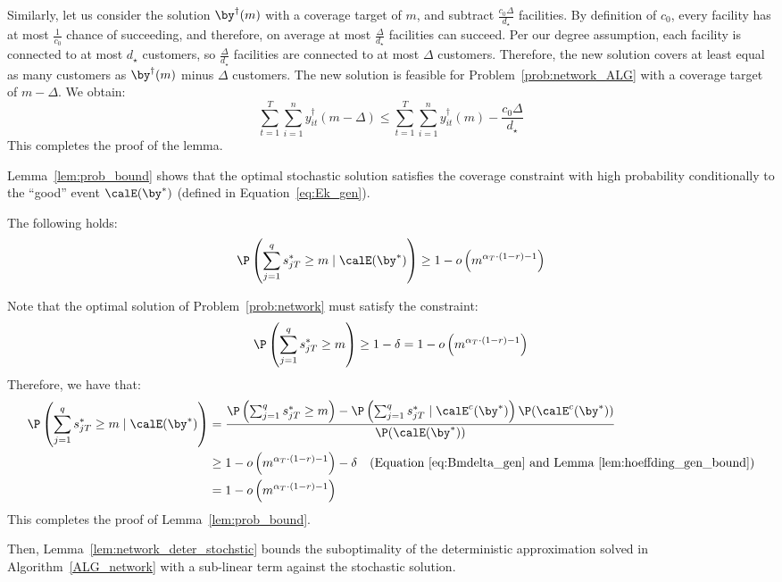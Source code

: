 \documentclass[blindrev]{informs3noheader}
\begin{document}
Similarly, let us consider the solution $\by^\dagger(m)$ with a coverage target of $m$, and subtract $\frac{c_0 \Delta}{d_\star}$ facilities. By definition of $c_0$, every facility has at most $\frac{1}{c_0}$ chance of succeeding, and therefore, on average at most $\frac{\Delta}{d_\star}$ facilities can succeed. Per our degree assumption, each facility is connected to at most $d_\star$ customers, so $\frac{\Delta}{d_\star}$ facilities are connected to at most $\Delta$ customers. Therefore, the new solution covers at least equal as many customers as $\by^\dagger(m)$ minus $\Delta$ customers. The new solution is feasible for Problem~\eqref{prob:network_ALG} with a coverage target of $m-\Delta$. We obtain:
\[\sum_{t=1}^T \sum_{i=1}^n y_{it}^\dagger(m-\Delta)\leq \sum_{t=1}^T \sum_{i=1}^n y_{it}^\dagger(m)-\frac{c_0 \Delta}{d_\star}\]
This completes the proof of the lemma.
\hfill\Halmos

Lemma~\ref{lem:prob_bound} shows that the optimal stochastic solution satisfies the coverage constraint with high probability conditionally to the ``good'' event $\calE(\by^*)$ (defined in Equation~\eqref{eq:Ek_gen}).

\begin{lemma}\label{lem:prob_bound}
The following holds:
\[\P\left(\sum_{j=1}^q s^*_{jT}\geq m\mid \calE(\by^*) \right)\geq 1-o\left(m^{\alpha_T\cdot(1-r)-1}\right)\]
\end{lemma}
Note that the optimal solution of Problem~\eqref{prob:network} must satisfy the constraint:
\begin{equation}
\P\left(\sum_{j=1}^q s^*_{jT}\geq m\right)\geq 1-\delta = 1-o\left(m^{\alpha_T\cdot(1-r)-1}\right)\label{eq:Bmdelta_gen}
\end{equation}
Therefore, we have that:
\begin{align*}
\P\left(\sum_{j=1}^q s^*_{jT} \geq m \mid \calE(\by^*)\right)
&=\frac{\P\left(\sum_{j=1}^q s^*_{jT}\geq m\right)-\P\left(\sum_{j=1}^q s^*_{jT}\mid \calE^c(\by^*) \right)\P(\calE^c(\by^*))}{\P(\calE(\by^*))}\\
&\geq1-o\left(m^{\alpha_T\cdot(1-r)-1}\right)-\delta\quad\text{(Equation~\eqref{eq:Bmdelta_gen} and Lemma~\ref{lem:hoeffding_gen_bound})}\\
&=1-o\left(m^{\alpha_T\cdot(1-r)-1}\right)
\end{align*}
This completes the proof of Lemma~\ref{lem:prob_bound}.\hfill\Halmos

Then, Lemma~\ref{lem:network_deter_stochstic} bounds the suboptimality of the deterministic approximation solved in Algorithm~\ref{ALG_network} with a sub-linear term against the stochastic solution.
\end{document}
